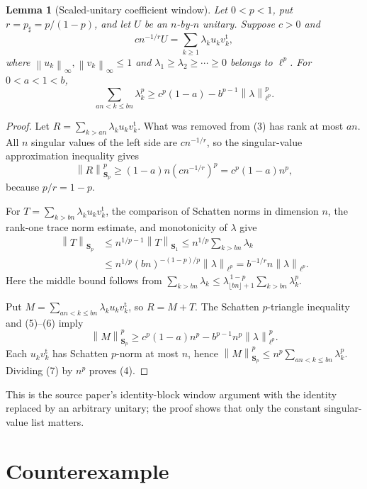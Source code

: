 \documentclass[11pt]{article}
\newtheorem{lemma}[theorem]{Lemma}
\theoremstyle{remark}
\newcommand{\Sp}{\boldsymbol S_p}
\newcommand{\norm}[1]{\left\lVert#1\right\rVert}
\begin{document}
\begin{lemma}[Scaled-unitary coefficient window]
\label{lem:window}
Let \(0<p<1\), put \(r=p_\sharp=p/(1-p)\), and let \(U\) be an
\(n\)-by-\(n\) unitary. Suppose \(c>0\) and
\[
 c n^{-1/r}U=\sum_{k\ge1}\lambda_k u_kv_k^{\mathrm t},       \tag{3}
\]
where \(\norm{u_k}_\infty,\norm{v_k}_\infty\le1\) and
\(\lambda_1\ge\lambda_2\ge\cdots\ge0\) belongs to \(\ell^p\).
For \(0<a<1<b\),
\[
 \sum_{an<k\le bn}\lambda_k^p
 \ge c^p(1-a)-b^{p-1}\norm{\lambda}_{\ell^p}^p.              \tag{4}
\]
\end{lemma}

\begin{proof}
Let \(R=\sum_{k>an}\lambda_k u_kv_k^{\mathrm t}\). What was removed from
(3) has rank at most \(an\). All \(n\) singular values of the left side are
\(c n^{-1/r}\), so the singular-value approximation inequality gives
\[
 \norm R_{\Sp}^p
 \ge (1-a)n(cn^{-1/r})^p
 =c^p(1-a)n^p,                                                \tag{5}
\]
because \(p/r=1-p\).

For \(T=\sum_{k>bn}\lambda_k u_kv_k^{\mathrm t}\), the comparison of
Schatten norms in dimension \(n\), the rank-one trace norm estimate, and
monotonicity of \(\lambda\) give
\begin{align*}
 \norm T_{\Sp}
 &\le n^{1/p-1}\norm T_{\boldsymbol S_1}
 \le n^{1/p}\sum_{k>bn}\lambda_k \\
 &\le n^{1/p}(bn)^{-(1-p)/p}\norm\lambda_{\ell^p}
 =b^{-1/r}n\norm\lambda_{\ell^p}.                            \tag{6}
\end{align*}
Here the middle bound follows from
\(\sum_{k>bn}\lambda_k\le
 \lambda_{\lfloor bn\rfloor+1}^{\,1-p}\sum_{k>bn}\lambda_k^p\).

Put \(M=\sum_{an<k\le bn}\lambda_k u_kv_k^{\mathrm t}\), so \(R=M+T\).
The Schatten \(p\)-triangle inequality and (5)--(6) imply
\[
 \norm M_{\Sp}^p
 \ge c^p(1-a)n^p-b^{p-1}n^p\norm\lambda_{\ell^p}^p.         \tag{7}
\]
Each \(u_kv_k^{\mathrm t}\) has Schatten \(p\)-norm at most \(n\), hence
\(\norm M_{\Sp}^p\le n^p\sum_{an<k\le bn}\lambda_k^p\).
Dividing (7) by \(n^p\) proves (4).
\end{proof}

This is the source paper's identity-block window argument with the identity
replaced by an arbitrary unitary; the proof shows that only the constant
singular-value list matters.

\section{Counterexample}
\end{document}
